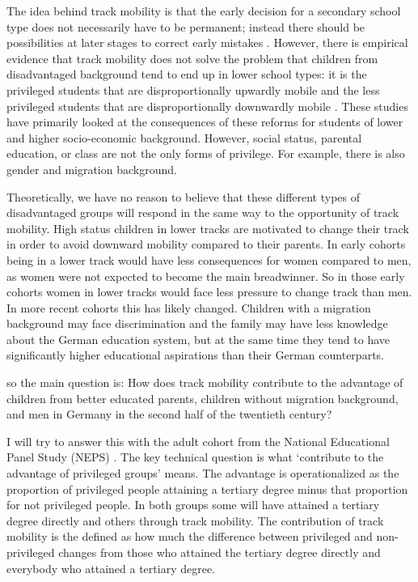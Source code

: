 \documentclass[a4,11pt]{article}
\begin{document}
The idea behind track mobility is that the early decision for a secondary school type does not necessarily have to be permanent; instead there should be possibilities at later stages to correct early mistakes \citep{Dustmann17}. However, there is empirical evidence that track mobility does not solve the problem that children from disadvantaged background tend to end up in lower school types: it is the privileged students that are disproportionally upwardly mobile and the less privileged students that are disproportionally downwardly mobile \citep{hillmert_jacob10,jacob_tieben09,maaz_etal04,neugebauer_schindler12,trautwein_etal08}. These studies have primarily looked at the consequences of these reforms for students of lower and higher socio-economic background. However, social status, parental education, or class are not the only forms of privilege. For example, there is also gender and migration background. 

Theoretically, we have no reason to believe that these different types of disadvantaged groups will respond in the same way to the opportunity of track mobility. High status children in lower tracks are motivated to change their track in order to avoid downward mobility compared to their parents. In early cohorts being in a lower track would have less consequences for women compared to men, as women were not expected to become the main breadwinner. So in those early cohorts women in lower tracks would face less pressure to change track than men. In more recent cohorts this has likely changed. Children with a migration background may face discrimination and the family may have less knowledge about the German education system, but at the same time they tend to have significantly higher educational aspirations than their German counterparts.

so the main question is: How does track mobility contribute to the advantage of children from better educated parents, children without migration background, and men in Germany in the second half of the twentieth century? 

I will try to answer this with the adult cohort from the National Educational Panel Study (NEPS) \citep{NEPS_adult}. The key technical question is what `contribute to the advantage of privileged groups' means. The advantage is operationalized as the proportion of privileged people attaining a tertiary degree minus that proportion for not privileged people. In both groups some will have attained a tertiary degree directly and others through track mobility. The contribution of track mobility is the defined as how much the difference between privileged and non-privileged changes from those who attained the tertiary degree directly and everybody who attained a tertiary degree. 



\end{document}
